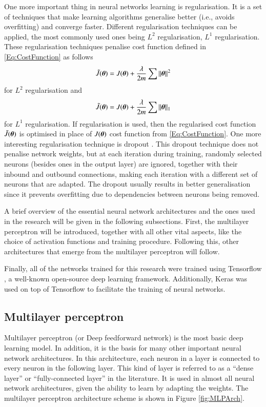 One more important thing in neural networks learning is regularisation. It is a set of techniques that make learning algorithms generalise better (i.e., avoids overfitting) and converge faster. Different regularisation techniques can be applied, the most commonly used ones being $L^2$ regularisation, $L^1$ regularisation. These regularisation techniques penalise cost function defined in \cref{Eq:CostFunction} as follows
\[
    \tilde{J}({\bm{\theta}})=J({\bm{\theta}})+\frac{\lambda}{2m}\sum\|{\bm{\theta}}\|^2
\]
for $L^2$ regularisation and
\[
    \tilde{J}({\bm{\theta}})=J({\bm{\theta}})+\frac{\lambda}{2m}\sum\|{\bm{\theta}}\|_1
\]
for $L^1$ regularisation. If regularisation is used, then the regularised cost function $\tilde{J}({\bm{\theta}})$ is optimised in place of $J({\bm{\theta}})$ cost function from \cref{Eq:CostFunction}. One more interesting regularisation technique is dropout \cite{Srivastava2014}. This dropout technique does not penalise network weights, but at each iteration during training, randomly selected neurons (besides ones in the output layer) are ignored, together with their inbound and outbound connections, making each iteration with a different set of neurons that are adapted. The dropout usually results in better generalisation since it prevents overfitting due to dependencies between neurons being removed.

A brief overview of the essential neural network architectures and the ones used in the research will be given in the following subsections. First, the multilayer perceptron will be introduced, together with all other vital aspects, like the choice of activation functions and training procedure. Following this, other architectures that emerge from the multilayer perceptron will follow. 

Finally, all of the networks trained for this research were trained using Tensorflow \cite{Abadi2015}, a well-known open-source deep learning framework. Additionally, Keras \cite{Chollet2015} was used on top of Tensorflow to facilitate the training of neural networks.

\subsection{Multilayer perceptron}
\label{sec:MLP}

Multilayer perceptron (or Deep feedforward network) is the most basic deep learning model. In addition, it is the basis for many other important neural network architectures. In this architecture, each neuron in a layer is connected to every neuron in the following layer. This kind of layer is referred to as a ``dense layer'' or ``fully-connected layer'' in the literature. It is used in almost all neural network architectures, given the ability to learn by adapting the weights. The multilayer perceptron architecture scheme is shown in Figure \ref{fig:MLPArch}.

